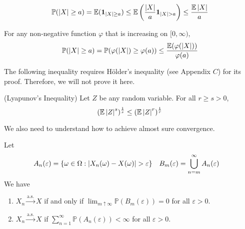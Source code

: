 \documentclass{huhtakm-template-book}
\newcommand{\prob}{\mathbb{P}}
\newcommand{\expect}{\mathbb{E}}
\begin{document}
    \begin{proofing}
        \begin{equation*}
            \prob(\abs{X}\geq a)=\expect(\mathbf{1}_{\abs{X}\geq a})\leq\expect\left(\frac{\abs{X}}{a}\mathbf{1}_{\abs{X}>a}\right)\leq\frac{\expect\abs{X}}{a}
        \end{equation*}
    \end{proofing}
    \begin{rem}
        For any non-negative function $\varphi$ that is increasing on $[0,\infty)$,
        \begin{equation*}
            \prob(\abs{X}\geq a)=\prob(\varphi(\abs{X})\geq\varphi(a))\leq\frac{\expect(\varphi(\abs{X}))}{\varphi(a)}
        \end{equation*}
    \end{rem}
    The following inequality requires H\"older's inequality (see Appendix $C$) for its proof. Therefore, we will not prove it here.
    \begin{lem}(Lyapunov's Inequality)
        Let $Z$ be any random variable. For all $r\geq s>0$,
        \begin{equation*}
            (\expect\abs{Z}^{s})^{\frac{1}{s}}\leq(\expect\abs{Z}^{r})^{\frac{1}{r}}
        \end{equation*}
    \end{lem}
    We also need to understand how to achieve almost sure convergence.
    \begin{lem}
        \label{Chapter 7 Lemma Obtaining almost sure convergence}
        Let
        \begin{align*}
            A_{n}(\varepsilon)&=\{\omega\in\Omega:\abs{X_{n}(\omega)-X(\omega)}>\varepsilon\} & B_{m}(\varepsilon)&=\bigcup_{n=m}^{\infty}A_{n}(\varepsilon)
        \end{align*}
        We have
        \begin{enumerate}
            \item $X_{n}\xrightarrow{\text{a.s.}}X$ if and only if $\lim_{m\uparrow\infty}\prob(B_{m}(\varepsilon))=0$ for all $\varepsilon>0$.
            \item $X_{n}\xrightarrow{\text{a.s.}}X$ if $\sum_{n=1}^{\infty}\prob(A_{n}(\varepsilon))<\infty$ for all $\varepsilon>0$.
        \end{enumerate}
    \end{lem}
\end{document}
